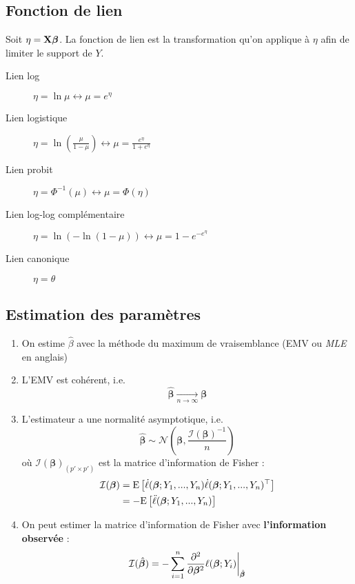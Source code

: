 \documentclass[10pt, french]{article}
\begin{document}
\begin{multicols*}{3}
\subsection*{Fonction de lien}
Soit $\eta = \mathbf{X} \boldsymbol{\beta}$. La fonction de lien est la transformation qu'on applique à $\eta$ afin de limiter le support de $Y$.
\begin{description}
\item[Lien log] $\eta = \ln \mu \leftrightarrow \mu = e^{\eta}$
\item[Lien logistique] $\eta = \ln \left( \frac{\mu}{1 - \mu} \right) \leftrightarrow \mu = \frac{e^{\eta}}{1 + e^{\eta}}$

\item[Lien probit] $\eta = \Phi^{-1}(\mu) \leftrightarrow \mu = \Phi(\eta)$

\item[Lien log-log complémentaire] $\eta = \ln ( - \ln (1 - \mu)) \leftrightarrow \mu = 1 - e^{-e^{\eta}}$

\item[Lien canonique] $\eta = \theta$ 
\end{description}

\subsection*{Estimation des paramètres}
\begin{enumerate}[label=\faAngleRight]
\item On estime $\hat{\beta}$ avec la méthode du maximum de vraisemblance (EMV ou \emph{MLE} en anglais)

\item L'EMV est cohérent, i.e.
\[\hat{\bm{\beta}} \underset{n \to \infty}{\longrightarrow} \bm{\beta} \]

\item L'estimateur a une normalité asymptotique, i.e.
\[  \hat{\bm{\beta}} \sim \mathcal{N} \left( \bm{\beta}, \frac{\mathcal{I}(\bm{\beta})^{-1}}{n} \right)    \]
où $\mathcal{I}(\bm{\beta})_{(p' \times p')}$ est la matrice d'information de Fisher : 
\begin{align*}
\mathcal{I}(\bm{\beta}) & = \mathrm{E} \left[ \dot{\ell}(\bm{\beta} ; Y_1, ..., Y_n) \dot{\ell}(\bm{\beta} ; Y_1, ..., Y_n)^{\top}  \right] \\
	& = - \mathrm{E} \left[ \ddot{\ell}(\bm{\beta} ; Y_1, ..., Y_n) \right] \\
\end{align*}

\item On peut estimer la matrice d'information  de Fisher avec \textbf{l'information observée} :
\[\mathcal{I}(\hat{\bm{\beta}}) = - \sum_{i=1}^{n} \frac{\partial^2}{\partial \bm{\beta}^2} \ell(\bm{\beta} ; Y_i)  \biggr \rvert_{\hat{\bm{\beta}}} \]
\end{enumerate}


\end{multicols*}
\end{document}

